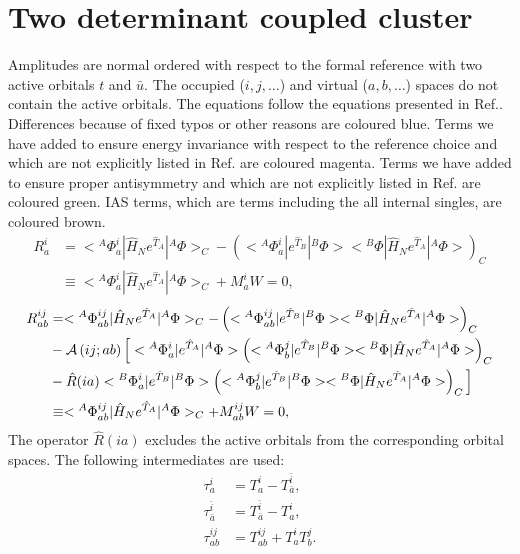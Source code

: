\documentclass[a4paper,12pt,oneside]{book}
\newcommand{\blue}[1]{{\color{blue} #1}}
\newcommand{\magenta}[1]{{\color{magenta} #1}}
\newcommand{\brown}[1]{{\color{brown} #1}}
\newcommand{\green}[1]{{\color{pinegreen} #1}}
\newcommand{\NL}{\nonumber \\}
\newcommand{\op}{\hat}
\newcommand{\ASop}[2]{{\cal A}\left(#1;#2\right)}
\newcommand{\spa}[1]{{#1}}
\newcommand{\spb}[1]{\bar{#1}}
\begin{document}
\chapter{Two determinant coupled cluster}
Amplitudes are normal ordered with respect to the formal reference with two active orbitals $t$ and $\spb{u}$.
The occupied ($i,j,\ldots$) and virtual ($a,b,\ldots$) spaces do not contain the active orbitals.
The equations follow the equations presented in Ref.\cite{szalay94}.
Differences because of fixed typos or other reasons are coloured \blue{blue}.
Terms we have added to ensure energy invariance with respect to the reference choice 
and which are not explicitly listed in Ref.\cite{szalay94} are coloured \magenta{magenta}.
Terms we have added to ensure proper antisymmetry and which are not explicitly listed in Ref.\cite{szalay94} are coloured \green{green}.
IAS terms, which are terms including the all internal singles, are coloured \brown{brown}.
\begin{align}
R^i_a &= < {}^A\Phi^i_a |\op H_N e^{\op T_A} | {}^A \Phi >_C - \left( < {}^A\Phi^i_a | e^{\op T_B} | {}^B\Phi ><{}^B\Phi | \op H_N e^{\op T_A} | {}^A \Phi> \right)_C \NL
      &\equiv < {}^A\Phi^i_a | \op H_N e^{\op T_A} | {}^A \Phi >_C + M^i_a W = 0,
\end{align}
\begin{align}
R^{ij}_{ab} &= <{}^A\Phi^{ij}_{ab} |\op H_N e^{\op T_A}| {}^A \Phi>_C - \left( <{}^A \Phi^{ij}_{ab} |e^{\op T_B}| {}^B \Phi><{}^B\Phi |\op H_N e^{\op T_A}| {}^A\Phi> \right)_C \NL
            &-\ASop{ij}{ab} \Big[ <{}^A \Phi^i_a |e^{\op T_A}| {}^A\Phi> \left( <{}^A\Phi^j_b |e^{\op T_B}| {}^B\Phi> <{}^B\Phi |\op H_N e^{\op T_A}| {}^A\Phi>  \right)_C \NL
                           &- \op R(ia) <{}^B \Phi^i_a |e^{\op T_B}| {}^B\Phi> \left( <{}^A\Phi^j_b |e^{\op T_B}| {}^B\Phi> <{}^B\Phi |\op H_N e^{\op T_A}| {}^A\Phi> \right)_C \Big] \NL
            &\equiv <{}^A\Phi^{ij}_{ab} |\op H_N e^{\op T_A}| {}^A\Phi>_C + M^{ij}_{ab} W = 0,
\end{align}
The operator $\op R(ia)$ excludes the active orbitals from the corresponding orbital spaces.
The following intermediates are used:
\begin{align}
\tau^{\spa{i}}_{\spa{a}}               &= T^{\spa{i}}_{\spa{a}} - T^{\spb{i}}_{\spb{a}}, \\
\tau^{\spb{i}}_{\spb{a}}               &= T^{\spb{i}}_{\spb{a}} - T^{\spa{i}}_{\spa{a}}, \\
\tau^{\spa{i}\spa{j}}_{\spa{a}\spa{b}} &= T^{\spa{i}\spa{j}}_{\spa{a}\spa{b}} + T^{\spa{i}}_{\spa{a}} T^{\spa{j}}_{\spa{b}}.
\end{align}
\end{document}

